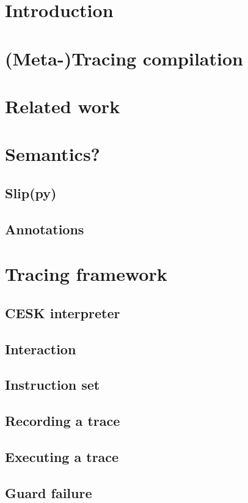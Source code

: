 \documentclass{report}
\begin{document}
\tableofcontents

\chapter{Introduction}

\chapter{(Meta-)Tracing compilation}

\chapter{Related work}

\chapter{Semantics?}
\section{Slip(py)}
\section{Annotations}

\chapter{Tracing framework}
\section{CESK interpreter}
\section{Interaction}
\section{Instruction set}
\section{Recording a trace}
\section{Executing a trace}
\section{Guard failure}
\end{document}
